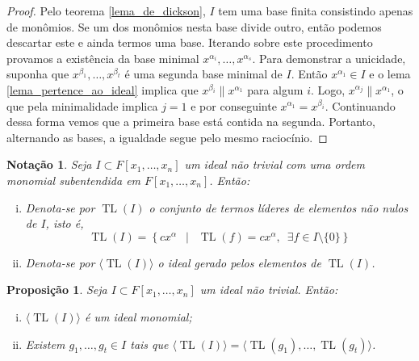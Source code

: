 \documentclass[12pt,a4paper]{report}
\newcommand{\suchthat}{\enspace\middle|\enspace}
\newcommand{\divides}{\parallel}
\newtheorem{proposition}[theorem]{Proposição}
\newtheorem*{notation}{Notação}
\numberwithin{theorem}{chapter}
\DeclareMathOperator{\TL}{TL}
\begin{document}
\begin{proof}
  Pelo teorema \ref{lema_de_dickson}, \(I\) tem uma base finita
  consistindo apenas de monômios.  Se um dos monômios nesta base
  divide outro, então podemos descartar este e ainda termos uma base.
  Iterando sobre este procedimento provamos a existência da base
  minimal \(x^{\alpha_i},\ldots,x^{\alpha_s}\).  Para demonstrar a
  unicidade, suponha que \(x^{\beta_1},\ldots,x^{\beta_t}\) é uma
  segunda base minimal de \(I\).  Então \(x^{\alpha_1} \in I\) e o
  lema \ref{lema_pertence_ao_ideal} implica que \(x^{\beta_i} \divides
  x^{\alpha_1}\) para algum \(i\).  Logo, \(x^{\alpha_j} \divides
  x^{\alpha_1}\), o que pela minimalidade implica \(j = 1\) e por
  conseguinte \(x^{\alpha_1} = x^{\beta_i}\).  Continuando dessa forma
  vemos que a primeira base está contida na segunda.  Portanto,
  alternando as bases, a igualdade segue pelo mesmo raciocínio.
\end{proof}

\begin{notation}
  Seja \(I \subset F[x_1,\ldots,x_n]\) um ideal não trivial com uma
  ordem monomial subentendida em \(F[x_1,\ldots,x_n]\).  Então:
  \begin{enumerate}[(i)]
  \item Denota-se por \(\TL(I)\) o conjunto de termos líderes de
    elementos não nulos de \(I\), isto é,
    \[\TL(I) = \left\{ cx^\alpha \suchthat \TL(f) = cx^\alpha,
      \enspace \exists f \in I\setminus\{0\} \right\}\]
  \item Denota-se por \(\langle \TL(I) \rangle\) o ideal gerado pelos
    elementos de \(\TL(I)\).
  \end{enumerate}
\end{notation}

\begin{proposition}\label{prop_3}
  Seja \(I \subset F[x_1,\ldots,x_n]\) um ideal não trivial.  Então:
  \begin{enumerate}[(i)]
  \item \(\langle \TL(I) \rangle\) é um ideal monomial;
  \item Existem \(g_1,\ldots,g_t \in I\) tais que \(\langle \TL(I)
    \rangle = \langle \TL(g_1),\ldots,\TL(g_t) \rangle\).
  \end{enumerate}
\end{proposition}
\end{document}
